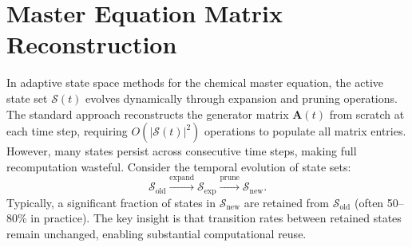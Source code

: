 \documentclass[final,supplement,onefignum,onetabnum]{siamart171218}
\begin{document}
\maketitle

\section{Master Equation Matrix Reconstruction}
\label{subsec:matrix_reconstruction}

In adaptive state space methods for the chemical master equation, the active state set $\mathcal{S}(t)$ evolves dynamically through expansion and pruning operations. The standard approach reconstructs the generator matrix $\mathbf{A}(t)$ from scratch at each time step, requiring $O(|\mathcal{S}(t)|^2)$ operations to populate all matrix entries. However, many states persist across consecutive time steps, making full recomputation wasteful. Consider the temporal evolution of state sets: 
\begin{equation}
\mathcal{S}_{\text{old}} \xrightarrow{\text{expand}} \mathcal{S}_{\text{exp}} \xrightarrow{\text{prune}} \mathcal{S}_{\text{new}}.
\end{equation}
Typically, a significant fraction of states in $\mathcal{S}_{\text{new}}$ are retained from $\mathcal{S}_{\text{old}}$ (often 50--80\% in practice). The key insight is that transition rates between retained states remain unchanged, enabling substantial computational reuse.
\end{document}
